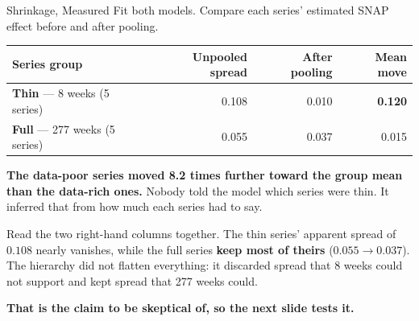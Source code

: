 \documentclass[aspectratio=169, 11pt]{beamer}
\begin{document}
\begin{frame}{Shrinkage, Measured}
  Fit both models. Compare each series' estimated SNAP effect before and after pooling.
  \begin{center}
    {\small
    \begin{tabular}{lrrr}
      \toprule
      \textbf{Series group} & \textbf{Unpooled spread} & \textbf{After pooling} & \textbf{Mean move} \\
      \midrule
      \textbf{Thin} --- 8 weeks (5 series) & 0.108 & 0.010 & \textbf{0.120} \\
      \textbf{Full} --- 277 weeks (5 series) & 0.055 & 0.037 & 0.015 \\
      \bottomrule
    \end{tabular}
    }
  \end{center}

  \vspace{-0.05cm}
  \textbf{The data-poor series moved 8.2 times further toward the group mean than the data-rich
  ones.} Nobody told the model which series were thin. It inferred that from how much each series
  had to say.

  \vspace{0.15cm}
  Read the two right-hand columns together. The thin series' apparent spread of $0.108$ nearly
  vanishes, while the full series \textbf{keep most of theirs} ($0.055 \rightarrow 0.037$). The
  hierarchy did not flatten everything: it discarded spread that 8 weeks could not support and
  kept spread that 277 weeks could.

  \vspace{0.1cm}
  \textbf{That is the claim to be skeptical of, so the next slide tests it.}
\end{frame}
\end{document}
